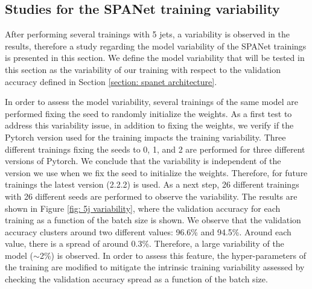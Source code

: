
\clearpage

\subsection{Studies for the SPANet training variability} \label{subsection: pairing variability}

After performing several trainings with 5 jets, a variability is observed in the results, therefore a study regarding the model variability of the SPANet trainings is presented in this section. We define the model variability that will be tested in this section as the variability of our training with respect to the validation accuracy defined in Section \ref{section: spanet architecture}.

In order to assess the model variability, several trainings of the same model are performed fixing the seed to randomly initialize the weights. As a first test to address this variability issue, in addition to fixing the weights, we verify if the Pytorch version used for the training impacts the training variability. Three different trainings fixing the seeds to 0, 1, and 2 are performed for three different versions of Pytorch. We conclude that the variability is independent of the version we use when we fix the seed to initialize the weights. Therefore, for future trainings the latest version (2.2.2) is used. As a next step, 26 different trainings with 26 different seeds are performed to observe the variability. The results are shown in Figure \ref{fig: 5j variability}, where the validation accuracy for each training as a function of the batch size is shown. We observe that the validation accuracy clusters around two different values: 96.6\% and 94.5\%. Around each value, there is a spread of around 0.3\%. Therefore, a large variability of the model ($\sim$2\%) is observed. In order to assess this feature, the hyper-parameters of the training are modified to mitigate the intrinsic training variability assessed by checking the validation accuracy spread as a function of the batch size.

